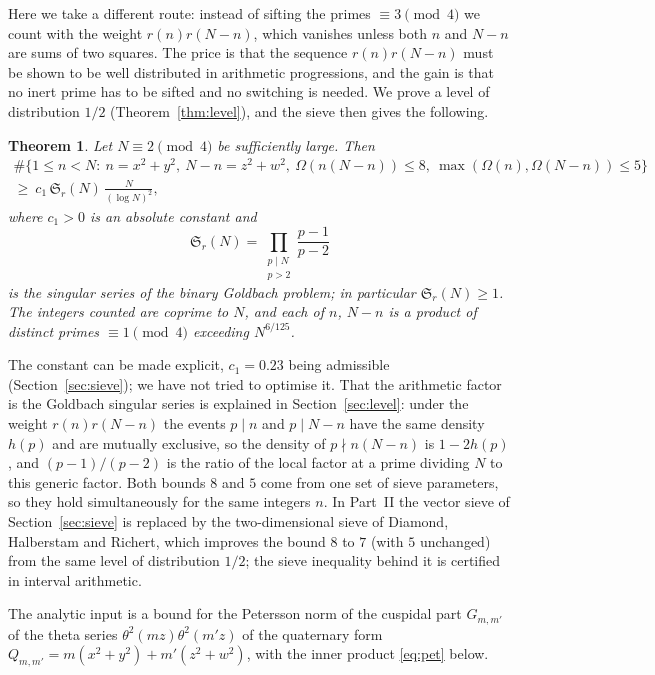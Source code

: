 \documentclass[11pt]{amsart}
\newtheorem{theorem}{Theorem}[section]
\theoremstyle{remark}
\newcommand{\Sg}{\mathfrak{S}}
\begin{document}
Here we take a different route: instead of sifting the primes $\equiv3\pmod 4$ we count with the weight $r(n)r(N-n)$, which vanishes unless both $n$ and $N-n$ are sums of two squares. The price is that the sequence $r(n)r(N-n)$ must be shown to be well distributed in arithmetic progressions, and the gain is that no inert prime has to be sifted and no switching is needed. We prove a level of distribution $1/2$ (Theorem~\ref{thm:level}), and the sieve then gives the following.

\begin{theorem}\label{thm:main}
Let $N\equiv2\pmod 4$ be sufficiently large. Then
\begin{multline*}
\#\bigl\{1\le n<N:\ n=x^2+y^2,\ N-n=z^2+w^2,\ \Omega(n(N-n))\le 8,\ \max(\Omega(n),\Omega(N-n))\le 5\bigr\}\\
\ge\ c_1\,\Sg_r(N)\,\frac{N}{(\log N)^2},
\end{multline*}
where $c_1>0$ is an absolute constant and
\begin{equation}\label{eq:Sr}
\Sg_r(N)=\prod_{\substack{p\mid N\\ p>2}}\frac{p-1}{p-2}
\end{equation}
is the singular series of the binary Goldbach problem; in particular $\Sg_r(N)\ge1$. The integers counted are coprime to $N$, and each of $n$, $N-n$ is a product of distinct primes $\equiv1\pmod 4$ exceeding $N^{6/125}$.
\end{theorem}

The constant can be made explicit, $c_1=0.23$ being admissible (Section~\ref{sec:sieve}); we have not tried to optimise it. That the arithmetic factor is the Goldbach singular series is explained in Section~\ref{sec:level}: under the weight $r(n)r(N-n)$ the events $p\mid n$ and $p\mid N-n$ have the same density $h(p)$ and are mutually exclusive, so the density of $p\nmid n(N-n)$ is $1-2h(p)$, and $(p-1)/(p-2)$ is the ratio of the local factor at a prime dividing $N$ to this generic factor. Both bounds $8$ and $5$ come from one set of sieve parameters, so they hold simultaneously for the same integers $n$. In Part~II \cite[Theorem~7.1]{ChenII} the vector sieve of Section~\ref{sec:sieve} is replaced by the two-dimensional sieve of Diamond, Halberstam and Richert, which improves the bound $8$ to $7$ (with $5$ unchanged) from the same level of distribution $1/2$; the sieve inequality behind it is certified in interval arithmetic.

The analytic input is a bound for the Petersson norm of the cuspidal part $G_{m,m'}$ of the theta series $\theta^2(mz)\theta^2(m'z)$ of the quaternary form $Q_{m,m'}=m(x^2+y^2)+m'(z^2+w^2)$, with the inner product \eqref{eq:pet} below.
\end{document}
